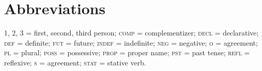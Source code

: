 \documentclass[output=paper]{LSP/langsci}
\begin{document}
\section*{Abbreviations}
1, 2, 3 = first, second, third person; \textsc{comp} = complementizer; \textsc{decl} = declarative; \textsc{def} = definite; \textsc{fut} = future; \textsc{indef} = indefinite; \textsc{neg} = negative; \textsc{o} =  agreement; \textsc{pl} = plural; \textsc{poss} = possessive; \textsc{prop} = proper name; \textsc{pst} = past tense; \textsc{refl} = reflexive; \textsc{s} =  agreement; \textsc{stat} = stative verb.
 
 \printbibliography[heading=subbibliography,notkeyword=this]
\end{document}
